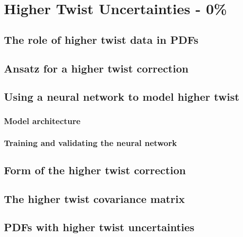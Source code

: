 \chapter{Higher Twist Uncertainties - 0\%}
\section{The role of higher twist data in PDFs}
\section{Ansatz for a higher twist correction}
\section{Using a neural network to model higher twist}
\subsection{Model architecture}
\subsection{Training and validating the neural network}
\section{Form of the higher twist correction}
\section{The higher twist covariance matrix}
\section{PDFs with higher twist uncertainties}
